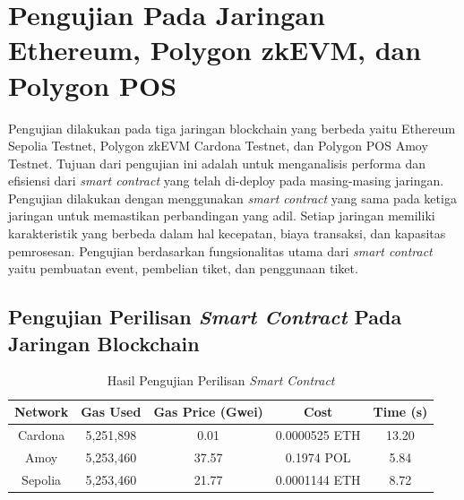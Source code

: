 \section{Pengujian Pada Jaringan Ethereum, Polygon zkEVM, dan Polygon POS}
Pengujian dilakukan pada tiga jaringan blockchain yang berbeda yaitu Ethereum
Sepolia Testnet, Polygon zkEVM Cardona Testnet, dan Polygon POS Amoy Testnet.
Tujuan dari pengujian ini adalah untuk menganalisis performa dan efisiensi dari
\emph{smart contract} yang telah di-deploy pada masing-masing jaringan.
Pengujian dilakukan dengan menggunakan \emph{smart contract} yang sama pada
ketiga jaringan untuk memastikan perbandingan yang adil. Setiap jaringan
memiliki karakteristik yang berbeda dalam hal kecepatan, biaya transaksi, dan
kapasitas pemrosesan. Pengujian berdasarkan fungsionalitas utama dari
\emph{smart contract} yaitu pembuatan event, pembelian tiket, dan penggunaan
tiket.

\subsection{Pengujian Perilisan \emph{Smart Contract} Pada Jaringan Blockchain}
\begin{table}[h]
  \centering
  \begin{tabular}{|c|c|c|c|c|}
    \hline
    \textbf{Network} & \textbf{Gas Used} & \textbf{Gas Price (Gwei)} & \textbf{Cost} & \textbf{Time (s)} \\
    \hline
    Cardona          & 5,251,898         & 0.01                      & 0.0000525 ETH & 13.20             \\
    Amoy             & 5,253,460         & 37.57                     & 0.1974 POL    & 5.84              \\
    Sepolia          & 5,253,460         & 21.77                     & 0.0001144 ETH & 8.72              \\
    \hline
  \end{tabular}
  \caption{Hasil Pengujian Perilisan \emph{Smart Contract}}
\end{table}


